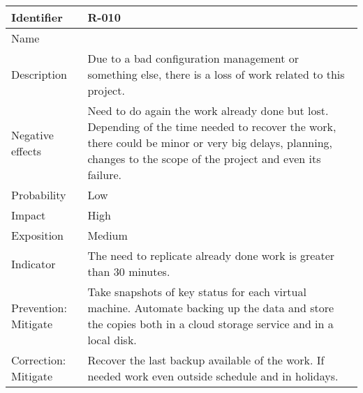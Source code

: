 \begin{table}[H]
	\begin{tabularx}{\textwidth}{|y|z|}
		\hline
		Identifier & \textbf{R-010} \\ \hline
		Name & \Rdiez \\ \hline
		Description &
			Due to a bad configuration management or something else, there is a loss of work related to this project.
		\\ \hline
		Negative effects &
			Need to do again the work already done but lost.\linej
			Depending of the time needed to recover the work, there could be minor or very big delays, planning, changes to the scope of the project and even its failure.
		\\ \hline
		Probability & Low\\ \hline
		Impact &  High\\ \hline
		Exposition &  Medium\\ \hline
		Indicator & The need to replicate already done work is greater than 30 minutes.\\ \hline
		Prevention: Mitigate &
			Take snapshots of key status for each virtual machine. \linej
			Automate backing up the data and store the copies both in a cloud storage service and in a local disk.
		\\ \hline
		Correction: Mitigate &
			Recover the last backup available of the work. \linej
			If needed work even outside schedule and in holidays.
		\\ \hline
	\end{tabularx}
\end{table}

